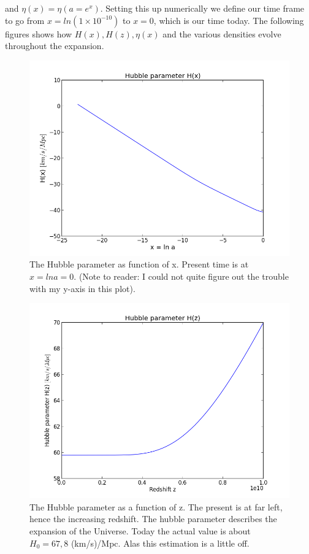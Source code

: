 \documentclass[norsk,a4paper,12pt]{article}
\begin{document}
and $\eta(x) = \eta(a=e^x)$. Setting this up numerically we define our time frame to go from $ x = ln(1\times10^{-10})$ to $x = 0$, which is our time today. The following figures shows how $H(x), H(z), \eta(x) $ and the various densities evolve throughout the expansion. 



\begin{figure}[H] 
\begin{center} 
\includegraphics[scale=0.5]{hubblex.png} 
 

\caption{The Hubble parameter as function of x. Present time is at $x = ln a = 0$. (Note to reader: I could not quite figure out the trouble with my y-axis in this plot).} 
\end{center} 
\end{figure}


\begin{figure}[H] 
\begin{center} 
\includegraphics[scale=0.5]{hubblez.png} 
 

\caption{The Hubble parameter as a function of z. The present is at far left, hence the increasing redshift. The hubble parameter describes the expansion of the Universe. Today the actual value is about $H_0 = 67,8$ (km/s)/Mpc. Alas this estimation is a little off.} 
\end{center} 
\end{figure}
\end{document}
